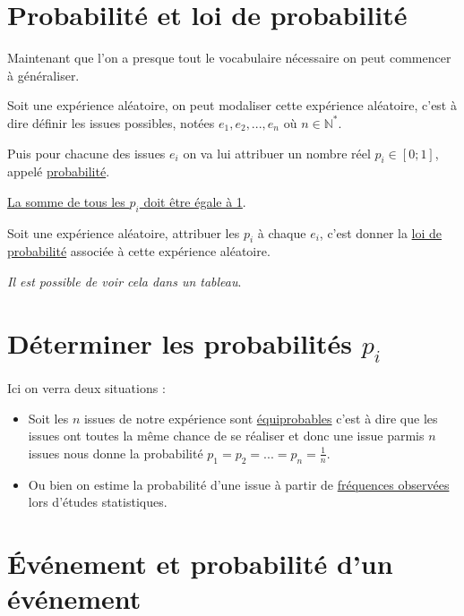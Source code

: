 \documentclass[french]{book}
\begin{document}

\section{Probabilité et loi de probabilité}
Maintenant que l'on a presque tout le vocabulaire nécessaire on peut commencer à généraliser.

\begin{defn}
Soit une expérience aléatoire, on peut modaliser cette expérience aléatoire, c'est à dire définir les issues possibles, notées $e_1,e_2,...,e_n$   où  $n \in \mathbb{N}^*$.

Puis pour chacune des issues $e_i$ on va lui attribuer un nombre réel $p_i \in [0;1]$, appelé \underline{probabilité}. 

\underline{La somme de tous les $p_i$ doit être égale à 1}.
\end{defn}

\begin{defn}
Soit une expérience aléatoire, attribuer les $p_i$ à chaque $e_i$, c'est donner la \underline{loi de probabilité} associée à cette expérience aléatoire.

\textit{Il est possible de voir cela dans un tableau}.
\end{defn}

\section{Déterminer les probabilités $p_i$}

Ici on verra deux situations : 
\begin{itemize}
\item Soit les $n$ issues de notre expérience sont  \underline{équiprobables} c'est à dire que les issues ont toutes la même chance de se réaliser et donc une issue parmis $n$ issues nous donne la probabilité $p_1=p_2=...=p_n=\frac{1}{n}$.
\item Ou bien on estime la probabilité d'une issue à partir de \underline{fréquences observées} lors d'études statistiques.
\end{itemize}

\section{Événement et probabilité d'un événement}
\end{document}
